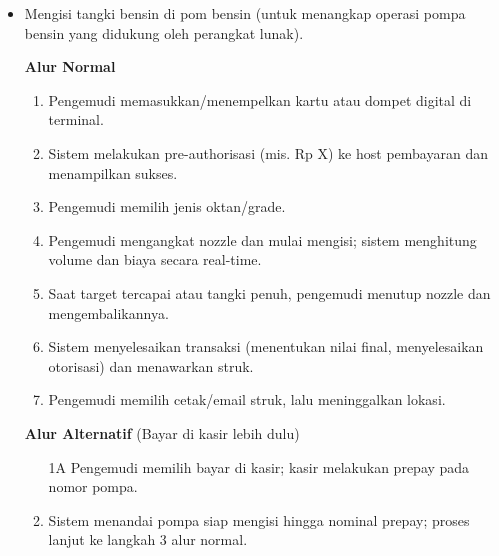 \documentclass[a4paper]{article}
\begin{document}
\begin{enumerate}[itemsep=1em]
\begin{itemize}[itemsep=1em]
    \item Mengisi tangki bensin di pom bensin (untuk menangkap operasi pompa bensin yang didukung oleh perangkat lunak).
    

    \vspace{1em}

    \textbf{Alur Normal}
    \begin{enumerate}[nosep]
      \item Pengemudi memasukkan/menempelkan kartu atau dompet digital di terminal.
      \item Sistem melakukan pre-authorisasi (mis. Rp X) ke host pembayaran dan menampilkan sukses.
      \item Pengemudi memilih jenis oktan/grade.
      \item Pengemudi mengangkat nozzle dan mulai mengisi; sistem menghitung volume dan biaya secara real-time.
      \item Saat target tercapai atau tangki penuh, pengemudi menutup nozzle dan mengembalikannya.
      \item Sistem menyelesaikan transaksi (menentukan nilai final, menyelesaikan otorisasi) dan menawarkan struk.
      \item Pengemudi memilih cetak/email struk, lalu meninggalkan lokasi.
    \end{enumerate}

    \vspace{1em}

    \textbf{Alur Alternatif} (Bayar di kasir lebih dulu)
    \begin{enumerate}[nosep]
      \item[1A] Pengemudi memilih bayar di kasir; kasir melakukan prepay pada nomor pompa.
      \item Sistem menandai pompa siap mengisi hingga nominal prepay; proses lanjut ke langkah 3 alur normal.
    \end{enumerate}


\end{itemize}
\end{enumerate}
\end{document}
